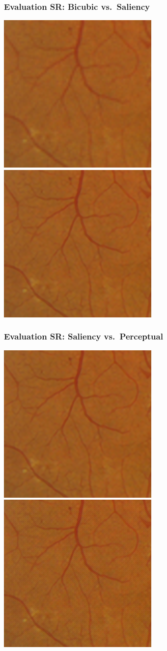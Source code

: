 \documentclass{beamer}
\begin{document}
\begin{frame} \frametitle{Evaluation SR: Bicubic vs.\ Saliency }
\includegraphics[width=0.48\linewidth]{patch_sr1_bic}\quad
\includegraphics[width=0.48\linewidth]{patch_sr1_sal}
\end{frame}

\begin{frame} \frametitle{Evaluation SR: Saliency vs.\ Perceptual }
\includegraphics[width=0.48\linewidth]{patch_sr1_sal}\quad
\includegraphics[width=0.48\linewidth]{patch_sr1_perc}
\end{frame}
\end{document}
